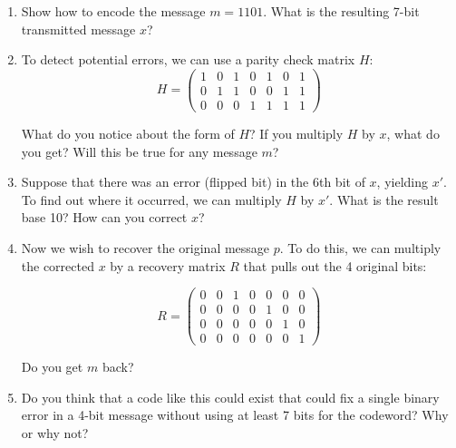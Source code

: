 \documentclass[11pt]{article}
\newif\ifsolutions
\begin{document}
\begin{enumerate}
\begin{enumerate}

\item Show how to encode the message $m=1101$.  What is the resulting 7-bit transmitted message $x$?
\vspace{15mm}

\ifsolutions 
\vspace{-15mm}
{\color{blue}{
\textbf{Solutions:} $Gm = x = 1010101$.
}}
\fi

\item To detect potential errors, we can use a parity check matrix $H$:
\[ H = \left( \begin{array}{ccccccc} 1 & 0 & 1 & 0 & 1 & 0 & 1 \\
0 & 1 & 1 & 0 & 0 & 1 & 1 \\
0 & 0 & 0 & 1 & 1 & 1 & 1
\end{array} \right)
\]

What do you notice about the form of $H$?  If you multiply $H$ by $x$, what do you get? Will this be true for any message $m$?
\vspace{15mm}

\item Suppose that there was an error (flipped bit) in the 6th bit of $x$, yielding $x'$. To find out where it occurred, we can multiply $H$ by $x'$. What is the result base 10? How can you correct $x$?
\vspace{15mm}

\ifsolutions 
\vspace{-15mm}
{\color{blue}{
\textbf{Solutions:} We actually received $x' = 1010111$. Computing $Hx'$, we get the sixth column of $H$, which corresponds to 6 in binary, so we know the 6th bit should be flipped to correct $x$.
}}
\fi

\item Now we wish to recover the original message $p$. To do this, we can multiply the corrected $x$ by a recovery matrix $R$ that pulls out the 4 original bits:

\[ R = \left( \begin{array}{ccccccc} 0 & 0 & 1 & 0 & 0 & 0 & 0 \\
0 & 0 & 0 & 0 & 1 & 0 & 0 \\
0 & 0 & 0 & 0 & 0 & 1 & 0 \\
0 & 0 & 0 & 0 & 0 & 0 & 1
\end{array} \right)
\]   

Do you get $m$ back?

\vspace{15mm}

\ifsolutions 
{\color{blue}{
\textbf{Solutions:} After correcting $x$, we compute $Rx = m$, and get back $m=1101$.
}}
\fi

\item Do you think that a code like this could exist that could fix a single binary error in a 4-bit message without using at least 7 bits for the codeword? Why or why not?

\end{enumerate}
 \end{enumerate}
\end{document}
